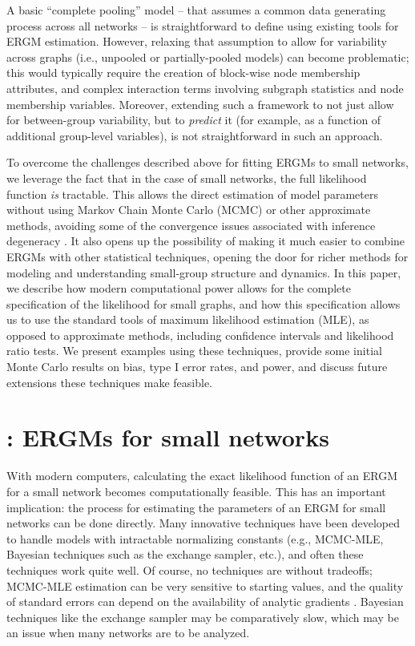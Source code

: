 \documentclass[review]{elsarticle}
\begin{document}
A basic ``complete pooling'' model -- that assumes a common data generating process across all networks -- is straightforward to define using existing tools for ERGM estimation. However, relaxing that assumption to allow for variability across graphs (i.e., unpooled or partially-pooled models) can become problematic; this would typically require the creation of block-wise node membership attributes, and complex interaction terms involving subgraph statistics and node membership variables. Moreover, extending such a framework to not just allow for between-group variability, but to \textit{predict} it (for example, as a function of additional group-level variables), is not straightforward in such an approach.

To overcome the challenges described above for fitting ERGMs to small networks, we leverage the fact that in the case of small networks, the full likelihood function \textit{is} tractable. This allows the direct estimation of model parameters without using Markov Chain Monte Carlo (MCMC) or other approximate methods, avoiding some of the convergence issues associated with inference degeneracy \cite{Handcock2003}. It also opens up the possibility of making it much easier to combine ERGMs with other statistical techniques, opening the door for richer methods for modeling and understanding small-group structure and dynamics. In this paper, we describe how modern computational power allows for the complete specification of the likelihood for small graphs, and how this specification allows us to use the standard tools of maximum likelihood estimation (MLE), as opposed to approximate methods, including confidence intervals and likelihood ratio tests. We present examples using these techniques, provide some initial Monte Carlo results on bias, type I error rates, and power, and discuss future extensions these techniques make feasible.

\section{\ergmitos{}: ERGMs for small networks}

With modern computers, calculating the exact likelihood function of an ERGM for a small network becomes computationally feasible. This has an important implication: the process for estimating the parameters of an ERGM for small networks can be done directly. Many innovative techniques have been developed to handle models with intractable normalizing constants (e.g., MCMC-MLE, Bayesian techniques such as the exchange sampler, etc.), and often these techniques work quite well. Of course, no techniques are without tradeoffs; MCMC-MLE estimation can be very sensitive to starting values, and the quality of standard errors can depend on the availability of analytic gradients \cite{Park2018}. Bayesian techniques like the exchange sampler \cite{Moller2006} may be comparatively slow, which may be an issue when many networks are to be analyzed.
\end{document}
